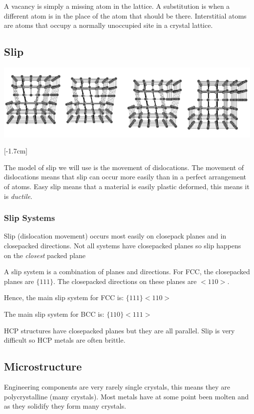 \documentclass[12pt]{article}
\begin{document}
A vacancy is simply a missing atom in the lattice.
A substitution is when a different atom is in the place of the atom that should be there. 
Interstitial atoms are atoms that occupy a normally unoccupied site in a crystal lattice.

\subsection{Slip}
\begin{center}
  \includegraphics[scale=0.2]{slip}
\end{center}

[-1.7cm]

The model of slip we will use is the movement of dislocations.
The movement of dislocations means that slip can occur more easily than in a perfect arrangement of atoms.
Easy slip means that a material is easily plastic deformed, this means it is \textit{ductile}.


\subsubsection{Slip Systems}
Slip (dislocation movement) occurs most easily on closepack planes and in closepacked directions.
Not all systems have closepacked planes so slip happens on the \textit{closest} packed plane  

A slip system is a combination of planes and directions.
For FCC, the closepacked planes are $\{111\}$.
The closepacked directions on these planes are $<110>$.

Hence, the main slip system for FCC is: $\{111\}<110>$

The main slip system for BCC is: $\{110\}<111>$

HCP structures have closepacked planes but they are all parallel.
Slip is very difficult so HCP metals are often brittle. 

\subsection{Microstructure}
Engineering components are very rarely single crystals, this means they are polycrystalline (many crystals).
Most metals have at some point been molten and as they solidify they form many crystals.
\end{document}

